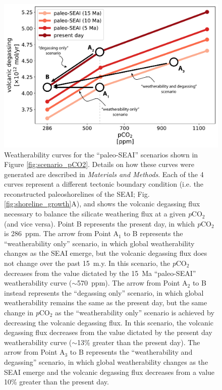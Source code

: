 \documentclass[9pt,twocolumn,twoside,lineno]{pnas-new}
\newcommand{\pCOtwo}{\textit{p}CO$_{2}$\xspace}
\newcommand{\MM}{\textit{Materials and Methods}\xspace}
\begin{document}
\begin{figure}[h]
    \centering
    \includegraphics[width=1\linewidth]{Manuscript/Figures/weatherability_curves.pdf}
    \caption{Weatherability curves for the ``paleo-SEAI'' scenarios shown in Figure \ref{fig:scenario_pCO2}. Details on how these curves were generated are described in \MM. Each of the 4 curves represent a different tectonic boundary condition (i.e. the reconstructed paleoshorelines of the SEAI; Fig. \ref{fig:shoreline_growth}A), and shows the volcanic degassing flux necessary to balance the silicate weathering flux at a given \pCOtwo (and vice versa). Point B represents the present day, in which \pCOtwo is 286~ppm. The arrow from Point A$_{1}$ to B represents the ``weatherability only'' scenario, in which global weatherability changes as the SEAI emerge, but the volcanic degassing flux does not change over the past 15~m.y. In this scenario, the \pCOtwo decreases from the value dictated by the 15~Ma ``paleo-SEAI'' weatherability curve ($\sim$570~ppm). The arrow from Point A$_{2}$ to B instead represents the ``degassing only'' scenario, in which global weatherability remains the same as the present day, but the same change in \pCOtwo as the ``weatherability only'' scenario is achieved by decreasing the volcanic degassing flux. In this scenario, the volcanic degassing flux decreases from the value dictated by the present day weatherability curve ($\sim$13\% greater than the present day). The arrow from Point A$_{3}$ to B represents the ``weatherability and degassing'' scenario, in which global weatherability changes as the SEAI emerge and the volcanic degassing flux decreases from a value 10\% greater than the present day.}
    \label{fig:weatherability_curves}
\end{figure}
\end{document}
